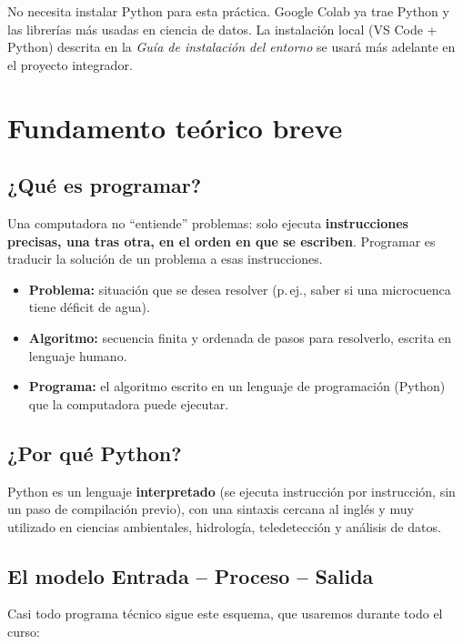 \documentclass[11pt,a4paper]{article}
\begin{document}
\begin{tip}
No necesita instalar Python para esta práctica. Google Colab ya trae Python y las librerías más usadas en ciencia de datos. La instalación local (VS Code + Python) descrita en la \emph{Guía de instalación del entorno} se usará más adelante en el proyecto integrador.
\end{tip}

\section{Fundamento teórico breve}

\subsection{¿Qué es programar?}
Una computadora no ``entiende'' problemas: solo ejecuta \textbf{instrucciones precisas, una tras otra, en el orden en que se escriben}. Programar es traducir la solución de un problema a esas instrucciones.

\begin{itemize}
  \item \textbf{Problema:} situación que se desea resolver (p.\,ej., saber si una microcuenca tiene déficit de agua).
  \item \textbf{Algoritmo:} secuencia finita y ordenada de pasos para resolverlo, escrita en lenguaje humano.
  \item \textbf{Programa:} el algoritmo escrito en un lenguaje de programación (Python) que la computadora puede ejecutar.
\end{itemize}

\subsection{¿Por qué Python?}
Python es un lenguaje \textbf{interpretado} (se ejecuta instrucción por instrucción, sin un paso de compilación previo), con una sintaxis cercana al inglés y muy utilizado en ciencias ambientales, hidrología, teledetección y análisis de datos.

\subsection{El modelo Entrada -- Proceso -- Salida}
Casi todo programa técnico sigue este esquema, que usaremos durante todo el curso:
\end{document}
